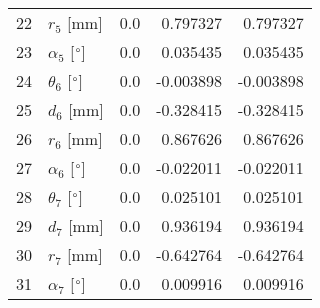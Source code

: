 \documentclass{standalone}%
\begin{document}
\begin{tabular}{llrrr}
22 &              $r_{5}$ [mm] &       0.0 &   0.797327 &   0.797327 \\
23 &  $\alpha_{5}$ [$\degree$] &       0.0 &   0.035435 &   0.035435 \\
24 &  $\theta_{6}$ [$\degree$] &       0.0 &  -0.003898 &  -0.003898 \\
25 &              $d_{6}$ [mm] &       0.0 &  -0.328415 &  -0.328415 \\
26 &              $r_{6}$ [mm] &       0.0 &   0.867626 &   0.867626 \\
27 &  $\alpha_{6}$ [$\degree$] &       0.0 &  -0.022011 &  -0.022011 \\
28 &  $\theta_{7}$ [$\degree$] &       0.0 &   0.025101 &   0.025101 \\
29 &              $d_{7}$ [mm] &       0.0 &   0.936194 &   0.936194 \\
30 &              $r_{7}$ [mm] &       0.0 &  -0.642764 &  -0.642764 \\
31 &  $\alpha_{7}$ [$\degree$] &       0.0 &   0.009916 &   0.009916 \\
\bottomrule
\end{tabular}
%
\end{document}
